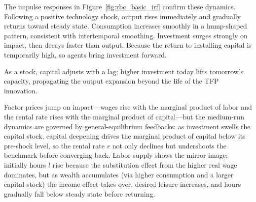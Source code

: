 \documentclass[a4paper,12pt]{article} %
\theoremstyle{nonitalic}
\begin{document}
% 


% 

The impulse responses in Figure~\ref{fig:rbc_basic_irf} confirm these dynamics.
Following a positive technology shock, output rises immediately and gradually returns toward steady state.
Consumption increases smoothly in a hump-shaped pattern, consistent with intertemporal smoothing.
Investment surges strongly on impact, then decays faster than output.
Because the return to installing capital is temporarily high,
so agents bring investment forward.

As a stock, capital adjusts with a lag;
higher investment today lifts tomorrow's capacity,
propagating the output expansion beyond the life of the TFP innovation.

Factor prices jump on impact—wages rise with the marginal product of labor and the rental rate rises with the marginal product of capital—but the medium-run dynamics are governed by general-equilibrium feedbacks:
as investment swells the capital stock, capital deepening drives the marginal product of capital below its pre-shock level,
so the rental rate $r$ not only declines but undershoots the benchmark before converging back.
Labor supply shows the mirror image:
initially hours $l$ rise because the substitution effect from the higher real wage dominates,
but as wealth accumulates (via higher consumption and a larger capital stock) the income effect takes over,
desired leisure increases, and hours gradually fall below steady state before returning.
\end{document}
